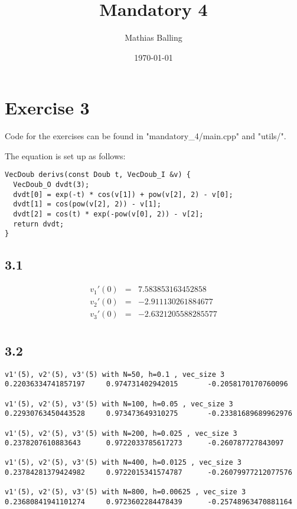 \documentclass{article}
\title{Mandatory 4}
\author{Mathias Balling}
\date{\today}
\begin{document}
\maketitle

\section*{Exercise 3}
Code for the exercises can be found in "mandatory\_4/main.cpp" and "utils/".

The equation is set up as follows:
\begin{verbatim}
VecDoub derivs(const Doub t, VecDoub_I &v) {
  VecDoub_O dvdt(3);
  dvdt[0] = exp(-t) * cos(v[1]) + pow(v[2], 2) - v[0];
  dvdt[1] = cos(pow(v[2], 2)) - v[1];
  dvdt[2] = cos(t) * exp(-pow(v[0], 2)) - v[2];
  return dvdt;
}
\end{verbatim}

\subsection*{3.1}
$$\begin{array}{rcl}
  v_1'(0)&=&7.583853163452858\\
  v_2'(0)&=&-2.911130261884677\\
  v_3'(0)&=&-2.6321205588285577\\
\end{array}$$

\subsection*{3.2}
\begin{verbatim}
v1'(5), v2'(5), v3'(5) with N=50, h=0.1 , vec_size 3
0.22036334741857197     0.974731402942015       -0.2058170170760096

v1'(5), v2'(5), v3'(5) with N=100, h=0.05 , vec_size 3
0.22930763450443528     0.973473649310275       -0.23381689689962976

v1'(5), v2'(5), v3'(5) with N=200, h=0.025 , vec_size 3
0.2378207610883643      0.9722033785617273      -0.260787727843097

v1'(5), v2'(5), v3'(5) with N=400, h=0.0125 , vec_size 3
0.23784281379424982     0.9722015341574787      -0.26079977212077576

v1'(5), v2'(5), v3'(5) with N=800, h=0.00625 , vec_size 3
0.23680841941101274     0.9723602284478439      -0.25748963470881164
\end{verbatim}
\newpage
\end{document}

